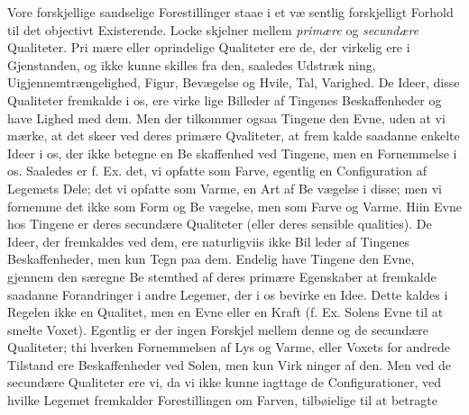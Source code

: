 \documentclass[12pt,a4paper]{book}
\begin{document}
Vore forskjellige sandselige Forestillinger staae i et væ\-%
sentlig forskjelligt Forhold til det objectivt Existerende. Locke
skjelner mellem \emph{primære} og \emph{secundære} Qualiteter. Pri\-%
mære eller oprindelige Qualiteter ere de, der virkelig ere i
Gjenstanden, og ikke kunne skilles fra den, saaledes Udstræk\-%
ning, Uigjennemtrængelighed, Figur, Bevægelse og Hvile, Tal,
Varighed. De Ideer, disse Qualiteter fremkalde i os, ere virke\-%
lige Billeder af Tingenes Beskaffenheder og have Lighed med
dem. Men der tilkommer ogsaa Tingene den Evne, uden at
vi mærke, at det skeer ved deres primære Qvaliteter, at frem\-%
kalde saadanne enkelte Ideer i os, der ikke betegne en Be\-%
skaffenhed ved Tingene, men en Fornemmelse i os. Saaledes
er f. Ex. det, vi opfatte som Farve, egentlig en Configuration
af Legemets Dele; det vi opfatte som Varme, en Art af Be\-%
vægelse i disse; men vi fornemme det ikke som Form og Be\-%
vægelse, men som Farve og Varme. Hiin Evne hos Tingene
er deres secundære Qualiteter (eller deres sensible qualities).
De Ideer, der fremkaldes ved dem, ere naturligviis ikke Bil\-%
leder af Tingenes Beskaffenheder, men kun Tegn paa dem.
Endelig have Tingene den Evne, gjennem den særegne Be\-%
stemthed af deres primære Egenskaber at fremkalde saadanne
Forandringer i andre Legemer, der i os bevirke en Idee.
Dette kaldes i Regelen ikke en Qualitet, men en Evne eller en
Kraft (f. Ex. Solens Evne til at smelte Voxet). Egentlig er
der ingen Forskjel mellem denne og de secundære Qualiteter;
thi hverken Fornemmelsen af Lys og Varme, eller Voxets for\-%
andrede Tilstand ere Beskaffenheder ved Solen, men kun Virk\-%
ninger af den. Men ved de secundære Qualiteter ere vi, da
vi ikke kunne iagttage de Configurationer, ved hvilke Legemet
fremkalder Forestillingen om Farven, tilbøielige til at betragte
\end{document}
